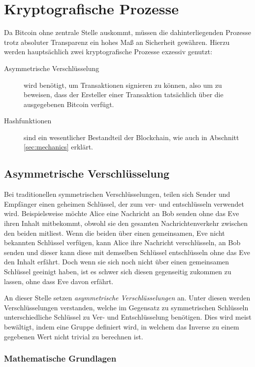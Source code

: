 \section{Kryptografische Prozesse}

Da Bitcoin ohne zentrale Stelle auskommt, müssen die dahinterliegenden Prozesse trotz absoluter Transparenz ein hohes Maß an Sicherheit gewähren.
Hierzu werden hauptsächlich zwei kryptografische Prozesse exzessiv genutzt:
\begin{description}
    \item[Asymmetrische Verschlüsselung] wird benötigt, um Transaktionen signieren zu können, also um zu beweisen, dass der Ersteller einer Transaktion tatsächlich über die ausgegebenen Bitcoin verfügt.
    \item[Hashfunktionen] sind ein wesentlicher Bestandteil der Blockchain, wie auch in Abschnitt \ref{sec:mechanics} erklärt.
\end{description}

\subsection{Asymmetrische Verschlüsselung}

Bei traditionellen symmetrischen Verschlüsselungen, teilen sich Sender und Empfänger einen geheimen Schlüssel, der zum ver- und entschlüsseln verwendet wird.
Beispielsweise möchte Alice eine Nachricht an Bob senden ohne das Eve ihren Inhalt mitbekommt, obwohl sie den gesamten Nachrichtenverkehr zwischen den beiden mitliest.
Wenn die beiden über einen gemeinsamen, Eve nicht bekannten Schlüssel verfügen, kann Alice ihre Nachricht verschlüsseln, an Bob senden und dieser kann diese mit demselben Schlüssel entschlüsseln ohne das Eve den Inhalt erfährt.
Doch wenn sie sich noch nicht über einen gemeinsamen Schlüssel geeinigt haben, ist es schwer sich diesen gegenseitig zukommen zu lassen, ohne dass Eve davon erfährt.

An dieser Stelle setzen \emph{asymmetrische Verschlüsselungen} an.
Unter diesen werden Verschlüsselungen verstanden, welche im Gegensatz zu symmetrischen Schlüsseln unterschiedliche Schlüssel zu Ver- und Entschlüsselung benötigen.
Dies wird meist bewältigt, indem eine Gruppe definiert wird, in welchem das Inverse zu einem gegebenen Wert nicht trivial zu berechnen ist.

\subsubsection{Mathematische Grundlagen}

